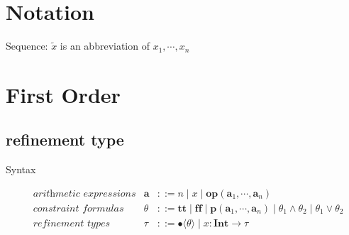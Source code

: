 \documentclass[runningheads]{llncs}
\newcommand \true {\textbf{tt}}
\newcommand \false {\textbf{ff}}
\newcommand \predicate {\textbf{p}}
\newcommand \arith {\textbf{a}}
\newcommand \operator {\mathbin{\textbf{op}}}
\newcommand \stypeint {\textbf{Int}}
\newcommand \stypebool {\bullet}
\newcommand \constraint {\theta}
\newcommand \refty {\tau}
\newcommand \typeint[1]{{#1} : \stypeint}
\newcommand \typebool[1]{\stypebool \langle #1 \rangle}
\begin{document}
\section{Notation}

Sequence: \(\tilde{x}\) is an abbreviation of \(x_1, \cdots, x_n\)

\section{First Order}

\subsection{refinement type}

Syntax

\begin{align*}
  &\textit{arithmetic expressions} &
  \arith &::=
  n
  \mid
  x
  \mid
  \operator(\arith_1, \cdots, \arith_n)
  \\
  &\textit{constraint formulas}&
  \constraint &::=
  \true
  \mid \false
  \mid \predicate(\arith_1, \cdots, \arith_n)
  \mid \constraint_1 \land \constraint_2
  \mid \constraint_1 \lor \constraint_2
  \\
  &\textit{refinement types}&
  \refty &::=
  \typebool{\theta}
  \mid \typeint{x} \rightarrow \refty
\end{align*}
\end{document}
